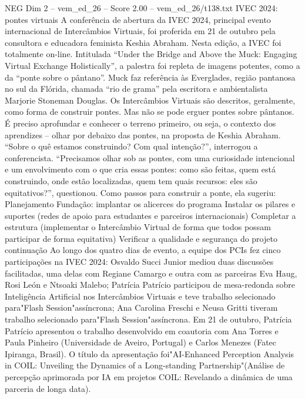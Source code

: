 \begin{textsample}{NEG Dim 2 – vem\_ed\_26 – Score 2.00 – vem\_ed\_26/t138.txt}  \label{ex:f2_neg_038}
IVEC 2024: pontes virtuais A conferência de abertura da IVEC 2024, principal evento internacional de Intercâmbios Virtuais, foi proferida em 21 de outubro pela consultora e educadora feminista Keshia Abraham.
Nesta edição, a IVEC foi totalmente on-line.
Intitulada “Under the Bridge and Above the Muck: Engaging Virtual Exchange Holistically”, a palestra foi repleta de imagens potentes, como a da “ponte sobre o pântano”.
Muck faz referência às Everglades, região pantanosa no sul da Flórida, chamada “rio de grama” pela escritora e ambientalista Marjorie Stoneman Douglas.
Os Intercâmbios Virtuais são descritos, geralmente, como forma de construir pontes.
Mas não se pode erguer pontes sobre pântanos.
É preciso aprofundar e conhecer o terreno primeiro, ou seja, o contexto dos aprendizes – olhar por debaixo das pontes, na proposta de Keshia Abraham. “Sobre o quê estamos construindo?
Com qual intenção?”, interrogou a conferencista. “Precisamos olhar sob as pontes, com uma curiosidade intencional e um envolvimento com o que cria essas pontes: como são feitas, quem está construindo, onde estão localizadas, quem tem quais recursos: eles são equitativos?”, questionou.
Como passos para construir a ponte, ela sugeriu: Planejamento Fundação: implantar os alicerces do programa Instalar os pilares e suportes (redes de apoio para estudantes e parceiros internacionais) Completar a estrutura (implementar o Intercâmbio Virtual de forma que todos possam participar de forma equitativa) Verificar a qualidade e segurança do projeto continuação Ao longo dos quatro dias de evento, a equipe dos PCIs fez cinco participações na IVEC 2024: Osvaldo Succi Junior mediou duas discussões facilitadas, uma delas com Regiane Camargo e outra com as parceiras Eva Haug, Rosi León e Ntsoaki Malebo; Patrícia Patrício participou de mesa-redonda sobre Inteligência Artificial nos Intercâmbios Virtuais e teve trabalho selecionado para"Flash Session"assíncrona; Ana Carolina Freschi e Neusa Gritti tiveram trabalho selecionado para"Flash Session"assíncrona.
Em 21 de outubro, Patrícia Patrício apresentou o trabalho desenvolvido em coautoria com Ana Torres e Paula Pinheiro (Universidade de Aveiro, Portugal) e Carlos Menezes (Fatec Ipiranga, Brasil).
O título da apresentação foi"AI-Enhanced Perception Analysis in COIL: Unveiling the Dynamics of a Long-standing Partnership"(Análise de percepção aprimorada por IA em projetos COIL: Revelando a dinâmica de uma parceria de longa data).

\end{textsample}
